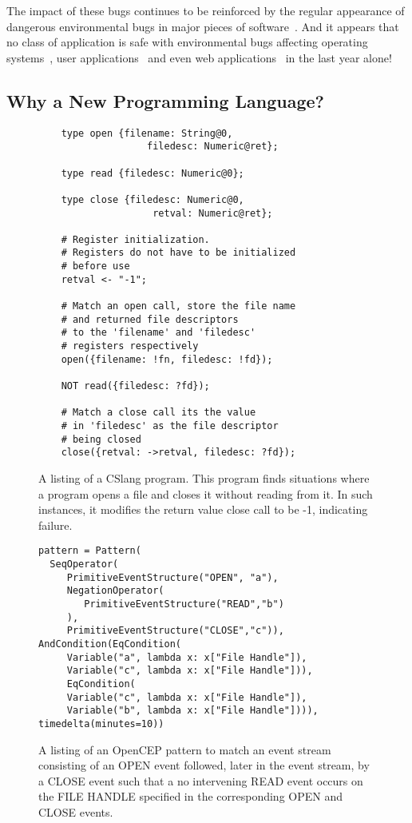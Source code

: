 The impact of these bugs continues to be reinforced by the regular
appearance of dangerous environmental bugs in major pieces of
software~\cite{devzeroroot}.  And it appears that no class of application
is safe with environmental bugs affecting operating systems~\cite{bad},
user applications~\cite{bad} and even web applications~\cite{bad} in the
last year alone!


\subsection{Why a New Programming Language?}
\begin{figure}
  \begin{lstlisting}
    type open {filename: String@0,
                   filedesc: Numeric@ret};

    type read {filedesc: Numeric@0};

    type close {filedesc: Numeric@0,
                    retval: Numeric@ret};

    # Register initialization.
    # Registers do not have to be initialized
    # before use
    retval <- "-1";

    # Match an open call, store the file name
    # and returned file descriptors
    # to the 'filename' and 'filedesc'
    # registers respectively
    open({filename: !fn, filedesc: !fd});

    NOT read({filedesc: ?fd});

    # Match a close call its the value
    # in 'filedesc' as the file descriptor
    # being closed
    close({retval: ->retval, filedesc: ?fd});

  \end{lstlisting}
  \caption{A listing of a CSlang program.  This program finds situations
  where a program opens a file and closes it without reading from it.  In
  such instances, it modifies the return value close call to be -1,
  indicating failure.}
  \label{fig:CSlangListing}
\end{figure}

\begin{figure}
  \begin{lstlisting}
pattern = Pattern(
  SeqOperator(
     PrimitiveEventStructure("OPEN", "a"),
     NegationOperator(
        PrimitiveEventStructure("READ","b")
     ),
     PrimitiveEventStructure("CLOSE","c")),
AndCondition(EqCondition(
     Variable("a", lambda x: x["File Handle"]),
     Variable("c", lambda x: x["File Handle"])),
     EqCondition(
     Variable("c", lambda x: x["File Handle"]),
     Variable("b", lambda x: x["File Handle"]))),
timedelta(minutes=10))
  \end{lstlisting}
  \caption{
    A listing of an OpenCEP pattern to match an event stream consisting of an OPEN event followed, later in the event stream, by a CLOSE event such that a no intervening READ event occurs on the FILE HANDLE specified in the corresponding OPEN and CLOSE events.
}
  \label{fig:OpenCEPListing}
\end{figure}


